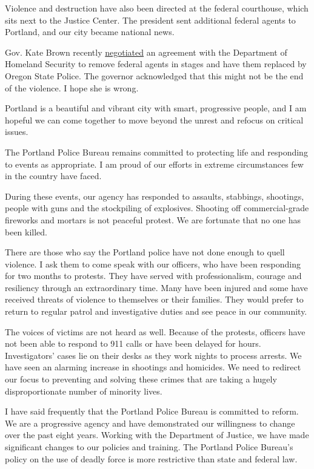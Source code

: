 Violence and destruction have also been directed at the federal
courthouse, which sits next to the Justice Center. The president sent
additional federal agents to Portland, and our city became national
news.

Gov. Kate Brown recently
\href{https://www.nytimes.com/2020/07/29/us/protests-portland-federal-withdrawal.html}{negotiated}
an agreement with the Department of Homeland Security to remove federal
agents in stages and have them replaced by Oregon State Police. The
governor acknowledged that this might not be the end of the violence. I
hope she is wrong.

Portland is a beautiful and vibrant city with smart, progressive people,
and I am hopeful we can come together to move beyond the unrest and
refocus on critical issues.

The Portland Police Bureau remains committed to protecting life and
responding to events as appropriate. I am proud of our efforts in
extreme circumstances few in the country have faced.

During these events, our agency has responded to assaults, stabbings,
shootings, people with guns and the stockpiling of explosives. Shooting
off commercial-grade fireworks and mortars is not peaceful protest. We
are fortunate that no one has been killed.

There are those who say the Portland police have not done enough to
quell violence. I ask them to come speak with our officers, who have
been responding for two months to protests. They have served with
professionalism, courage and resiliency through an extraordinary time.
Many have been injured and some have received threats of violence to
themselves or their families. They would prefer to return to regular
patrol and investigative duties and see peace in our community.

The voices of victims are not heard as well. Because of the protests,
officers have not been able to respond to 911 calls or have been delayed
for hours. Investigators' cases lie on their desks as they work nights
to process arrests. We have seen an alarming increase in shootings and
homicides. We need to redirect our focus to preventing and solving these
crimes that are taking a hugely disproportionate number of minority
lives.

I have said frequently that the Portland Police Bureau is committed to
reform. We are a progressive agency and have demonstrated our
willingness to change over the past eight years. Working with the
Department of Justice, we have made significant changes to our policies
and training. The Portland Police Bureau's policy on the use of deadly
force is more restrictive than state and federal law.

